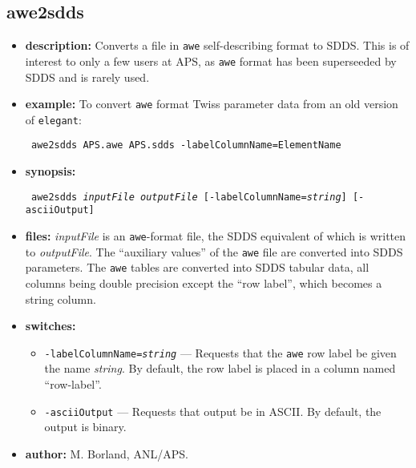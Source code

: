 \newpage
\subsection{awe2sdds}
\label{awe2sdds}

\begin{itemize}
\item {\bf description:} 
Converts a file in \verb|awe| self-describing format to SDDS.  This is of interest to
only a few users at APS, as \verb|awe| format has been superseeded by SDDS and is rarely used.
\item {\bf example:} 
To convert {\tt awe} format Twiss parameter data from an old version of \verb|elegant|:
\begin{flushleft}{\tt 
awe2sdds APS.awe APS.sdds -labelColumnName=ElementName
}\end{flushleft}
\item {\bf synopsis:}
\begin{flushleft}{\tt 
awe2sdds {\em inputFile} {\em outputFile} [-labelColumnName={\em string}] [-asciiOutput]
}\end{flushleft}
\item {\bf files:} 
{\em inputFile} is an {\tt awe}-format file, the SDDS equivalent of which is written to {\em outputFile}.
The ``auxiliary values'' of the {\tt awe} file are converted into SDDS parameters.  The {\tt awe} tables
are converted into SDDS tabular data, all columns being double precision except the ``row label'', which
becomes a string column.
\item {\bf switches:}
    \begin{itemize}
    \item {\tt -labelColumnName={\em string}} --- Requests that the {\tt awe} row label be given the name {\em string}.
        By default, the row label is placed in a column named ``row-label''.
    \item \verb|-asciiOutput| --- Requests that output be in ASCII.  By default, the output is binary.
    \end{itemize}
\item {\bf author:} M. Borland, ANL/APS.
\end{itemize}

